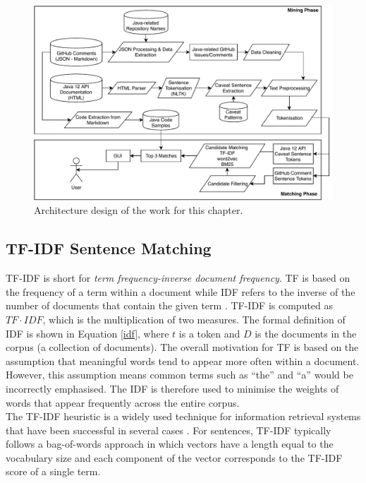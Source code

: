 \centering
\begin{figure}[h]
	\label{fig:github-architecture}
	\centering
	\includegraphics[width=\textwidth]{figs/github-architecture.pdf}
	\caption{Architecture design of the work for this chapter.}
\end{figure}
\flushleft

\subsection{TF-IDF Sentence Matching}
\label{subsec:info-tfidf}
TF-IDF is short for \textit{term frequency-inverse document frequency}. TF is based on the frequency of a term within a document while IDF refers to the inverse of the number of documents that contain the given term \cite{robertson2004understanding}. TF-IDF is computed as $TF\cdot IDF$, which is the multiplication of two measures. The formal definition of IDF is shown in Equation \ref{idf}, where $t$ is a token and $D$ is the documents in the corpus (a collection of documents). The overall motivation for TF is based on the assumption that meaningful words tend to appear more often within a document. However, this assumption means common terms such as ``the'' and ``a'' would be incorrectly emphasised. The IDF is therefore used to minimise the weights of words that appear frequently across the entire corpus. \\
The TF-IDF heuristic is a widely used technique for information retrieval systems that have been successful in several cases \cite{tfidf-explain}. For sentences, TF-IDF typically follows a bag-of-words approach in which vectors have a length equal to the vocabulary size and each component of the vector corresponds to the TF-IDF score of a single term.

